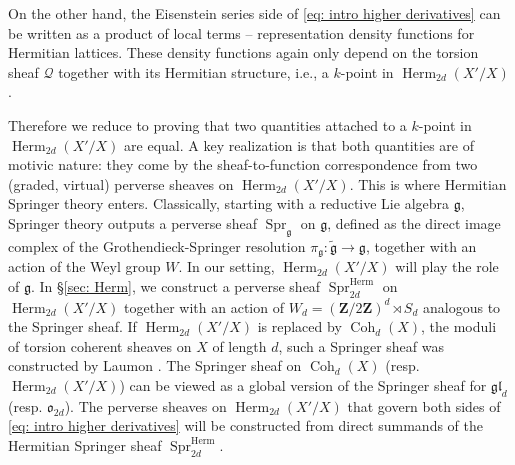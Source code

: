 \documentclass[reqno]{amsart}
\numberwithin{equation}{section}
\newcommand{\wt}[1]{\widetilde{#1}}
\newcommand{\Z}{\mathbf{Z}}
\DeclareMathOperator{\Herm}{Herm}
\DeclareMathOperator{\Coh}{Coh}
\DeclareMathOperator{\Spr}{Spr}
\newcommand\gl{\mathfrak{gl}}
\newcommand\cQ{\mathcal{Q}}
\newcommand\frg{\mathfrak{g}}
\theoremstyle{remark}
\numberwithin{equation}{section}
\begin{document}
On the other hand, the Eisenstein series side of \eqref{eq: intro higher derivatives} can be written as a product of local terms -- representation density functions for Hermitian lattices. These density functions again only depend on the torsion sheaf $\cQ$ together with its Hermitian structure, i.e., a $k$-point in $\Herm_{2d}(X'/X)$.

Therefore we reduce to proving that two quantities attached to a $k$-point in $\Herm_{2d}(X'/X)$ are equal. A key realization is that both quantities are of motivic nature: they come by the sheaf-to-function correspondence from two   (graded, virtual) perverse sheaves on $\Herm_{2d}(X'/X)$. This is where Hermitian Springer theory enters.  Classically, starting with a reductive Lie algebra $\frg$, Springer theory outputs a perverse sheaf $\Spr_{\frg}$ on $\frg$, defined as the direct image complex of the Grothendieck-Springer resolution $\pi_{\frg}: \wt\frg\to \frg$,  together with an action of the Weyl group $W$. In our setting, $\Herm_{2d}(X'/X)$ will play the role of $\frg$.  In  \S\ref{sec: Herm}, we construct a perverse sheaf $\Spr^{\Herm}_{2d}$ on $\Herm_{2d}(X'/X)$ together with an action of $W_{d}=(\Z/2\Z)^{d}\rtimes S_{d}$ analogous to the Springer sheaf.  If $\Herm_{2d}(X'/X)$ is replaced by $\Coh_{d}(X)$, the moduli of torsion coherent sheaves on $X$ of length $d$, such a Springer sheaf was constructed by Laumon \cite{Lau87}. The Springer sheaf on $\Coh_{d}(X)$ (resp. $\Herm_{2d}(X'/X)$) can be viewed as a global version of the Springer sheaf for $\gl_{d}$ (resp. $\mathfrak{o}_{2d}$). The perverse sheaves on $\Herm_{2d}(X'/X)$ that govern both sides of \eqref{eq: intro higher derivatives} will be constructed from direct summands of the Hermitian Springer sheaf $\Spr^{\Herm}_{2d}$.
\end{document}

